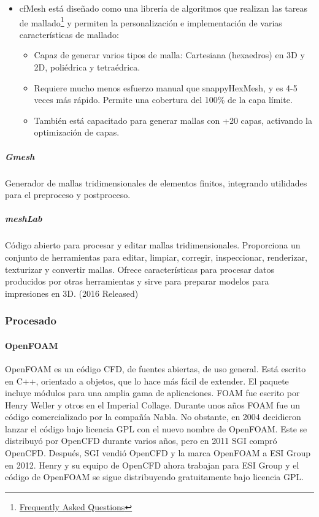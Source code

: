 \begin{itemize}
\item
  cfMesh está diseñado como una librería de algoritmos que realizan las
  tareas de mallado\footnote{\href{http://cfmesh.com/support-faq/}{Frequently
  Asked Questions}}  y permiten la personalización e implementación de
  varias características de mallado:
  \begin{itemize}
  \item
    Capaz de generar varios tipos de malla: Cartesiana (hexaedros) en 3D
    y 2D, poliédrica y tetraédrica.
  \item
    Requiere mucho menos esfuerzo manual que snappyHexMesh, y es 4-5
    veces más rápido. Permite una cobertura del 100\% de la capa límite.
  \item
    También está capacitado para generar mallas con +20 capas, activando
    la optimización de capas.
  \end{itemize}

\end{itemize}

\subparagraph{Gmesh\cite{geuzaine2009gmsh}}\label{header-n262}

Generador de mallas tridimensionales de elementos finitos, integrando
utilidades para el preproceso y postproceso.


\subparagraph{meshLab\cite{MeshLab}}\label{header-n265}

Código abierto para procesar y editar mallas tridimensionales.
Proporciona un conjunto de herramientas para editar, limpiar, corregir,
inspeccionar, renderizar, texturizar y convertir mallas. Ofrece
características para procesar datos producidos por otras herramientas y
sirve para preparar modelos para impresiones en 3D. (2016 Released)

\subsubsection{Procesado}\label{header-n269}

\paragraph{OpenFOAM\cite{OpenFOAM}}\label{header-n271}

OpenFOAM es un código CFD, de fuentes abiertas, de uso general. Está
escrito en C++, orientado a objetos, que lo hace más fácil de extender.
El paquete incluye módulos para una amplia gama de aplicaciones. FOAM
fue escrito por Henry Weller y otros en el Imperial Collage. Durante
unos años FOAM fue un código comercializado por la compañía Nabla. No
obstante, en 2004 decidieron lanzar el código bajo licencia GPL con el
nuevo nombre de OpenFOAM. Este se distribuyó por OpenCFD durante varios
años, pero en 2011 SGI compró OpenCFD. Después, SGI vendió OpenCFD y la
marca OpenFOAM a ESI Group en 2012. Henry y su equipo de OpenCFD ahora
trabajan para ESI Group y el código de OpenFOAM se sigue distribuyendo
gratuitamente bajo licencia GPL.

